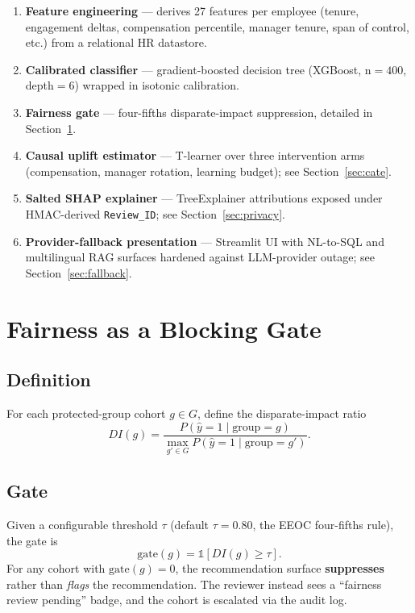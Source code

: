 \documentclass[conference]{IEEEtran}
\begin{document}
\begin{enumerate}
\item \textbf{Feature engineering} --- derives 27 features per employee
(tenure, engagement deltas, compensation percentile, manager tenure, span of
control, etc.) from a relational HR datastore.
\item \textbf{Calibrated classifier} --- gradient-boosted decision tree
(XGBoost, n${=}400$, depth${=}6$) wrapped in isotonic calibration.
\item \textbf{Fairness gate} --- four-fifths disparate-impact suppression,
detailed in Section~\ref{sec:gate}.
\item \textbf{Causal uplift estimator} --- T-learner over three intervention
arms (compensation, manager rotation, learning budget); see Section~\ref{sec:cate}.
\item \textbf{Salted SHAP explainer} --- TreeExplainer attributions exposed
under HMAC-derived \texttt{Review\_ID}; see Section~\ref{sec:privacy}.
\item \textbf{Provider-fallback presentation} --- Streamlit UI with NL-to-SQL
and multilingual RAG surfaces hardened against LLM-provider outage; see
Section~\ref{sec:fallback}.
\end{enumerate}

\section{Fairness as a Blocking Gate}
\label{sec:gate}

\subsection{Definition}
For each protected-group cohort $g \in G$, define the disparate-impact ratio
\begin{equation}
DI(g) = \frac{P(\hat y = 1 \mid \mathrm{group} = g)}{\max_{g' \in G} P(\hat y = 1 \mid \mathrm{group} = g')}.
\label{eq:di}
\end{equation}

\subsection{Gate}
Given a configurable threshold $\tau$ (default $\tau=0.80$, the EEOC
four-fifths rule), the gate is
\begin{equation}
\mathrm{gate}(g) = \mathbb{1}\!\left[ DI(g) \geq \tau \right].
\end{equation}
For any cohort with $\mathrm{gate}(g)=0$, the recommendation surface
\textbf{suppresses} rather than \emph{flags} the recommendation. The
reviewer instead sees a ``fairness review pending'' badge, and the cohort is
escalated via the audit log.
\end{document}
